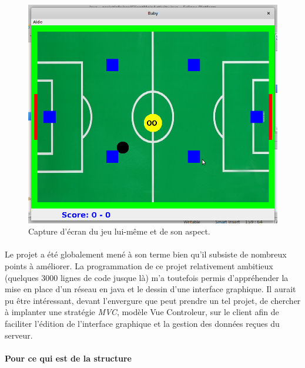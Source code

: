 \documentclass[a4paper,12pt]{report}
\begin{document}
\begin{figure}[H]

\begin{center}

\includegraphics[width=15cm]{pictures/header.jpg}

\end{center}

\caption{Capture d'écran du jeu lui-même et de son aspect.}

\end{figure}

\paragraph{}

Le projet a été globalement mené à son terme bien qu'il subsiste de nombreux points à améliorer. La programmation de ce projet relativement ambitieux (quelques $3000$ lignes de code jusque là) m'a toutefois permis d'appréhender la mise en place d'un réseau en java et le dessin d'une interface graphique. Il aurait pu être intéressant, devant l'envergure que peut prendre un tel projet, de chercher à implanter une stratégie \emph{MVC}, modèle Vue Controleur, sur le client afin de faciliter l'édition de l'interface graphique et la gestion des données reçues du serveur. 

\paragraph{Pour ce qui est de la structure}
\end{document}
